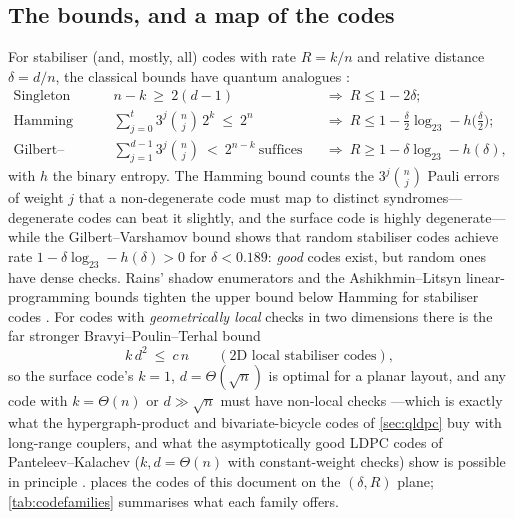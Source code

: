 \subsection{The bounds, and a map of the codes}\label{sec:bounds}

For stabiliser (and, mostly, all) codes with rate $R=k/n$ and relative distance $\delta=d/n$, the classical bounds have quantum analogues \cite{gottesman97,crss98,ekert-macchiavello96,rains99shadow,ashikhmin-litsyn99}:
\begin{align}
\text{Singleton (Knill--Laflamme):}\quad& n-k\ \ge\ 2(d-1) &&\Rightarrow\ R\le1-2\delta;\label{eq:singleton}\\
\text{Hamming (non-degenerate):}\quad& \sum_{j=0}^{t}3^j\binom nj\,2^k\ \le\ 2^n &&\Rightarrow\ R\le1-\tfrac{\delta}{2}\log_23-h\!\big(\tfrac\delta2\big);\label{eq:hamming}\\
\text{Gilbert--Varshamov (existence):}\quad& \sum_{j=1}^{d-1}3^j\binom nj\ <\ 2^{n-k}\ \text{suffices} &&\Rightarrow\ R\ge1-\delta\log_23-h(\delta),\label{eq:gv}
\end{align}
with $h$ the binary entropy. The Hamming bound counts the $3^j\binom nj$ Pauli errors of weight $j$ that a non-degenerate code must map to distinct syndromes---degenerate codes can beat it slightly, and the surface code is highly degenerate---while the Gilbert--Varshamov bound shows that random stabiliser codes achieve rate $1-\delta\log_23-h(\delta)>0$ for $\delta<0.189$: \emph{good} codes exist, but random ones have dense checks. Rains' shadow enumerators and the Ashikhmin--Litsyn linear-programming bounds tighten the upper bound below Hamming for stabiliser codes \cite{rains99shadow,ashikhmin-litsyn99}. For codes with \emph{geometrically local} checks in two dimensions there is the far stronger Bravyi--Poulin--Terhal bound
\begin{equation}\label{eq:bpt}
k\,d^2\ \le\ c\,n\qquad(\text{2D local stabiliser codes}),
\end{equation}
so the surface code's $k=1$, $d=\Theta(\sqrt n)$ is optimal for a planar layout, and any code with $k=\Theta(n)$ or $d\gg\sqrt n$ must have non-local checks \cite{bpt10,bravyi-terhal09}---which is exactly what the hypergraph-product and bivariate-bicycle codes of \cref{sec:qldpc} buy with long-range couplers, and what the asymptotically good LDPC codes of Panteleev--Kalachev ($k,d=\Theta(n)$ with constant-weight checks) show is possible in principle \cite{panteleev-kalachev21good,leverrier-zemor22}.  places the codes of this document on the $(\delta,R)$ plane; \cref{tab:codefamilies} summarises what each family offers.

